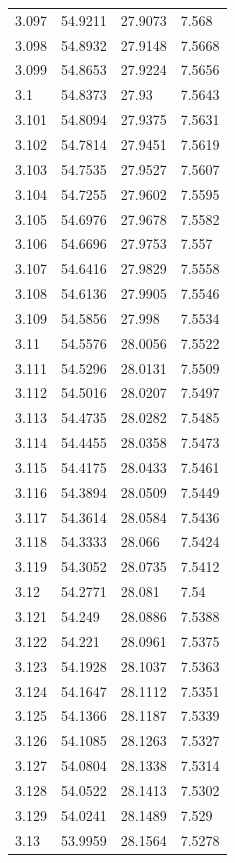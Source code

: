 \begin{tabular}{llll}
3.097 & 54.9211 & 27.9073 & 7.568 \\
3.098 & 54.8932 & 27.9148 & 7.5668 \\
3.099 & 54.8653 & 27.9224 & 7.5656 \\
3.1 & 54.8373 & 27.93 & 7.5643 \\
3.101 & 54.8094 & 27.9375 & 7.5631 \\
3.102 & 54.7814 & 27.9451 & 7.5619 \\
3.103 & 54.7535 & 27.9527 & 7.5607 \\
3.104 & 54.7255 & 27.9602 & 7.5595 \\
3.105 & 54.6976 & 27.9678 & 7.5582 \\
3.106 & 54.6696 & 27.9753 & 7.557 \\
3.107 & 54.6416 & 27.9829 & 7.5558 \\
3.108 & 54.6136 & 27.9905 & 7.5546 \\
3.109 & 54.5856 & 27.998 & 7.5534 \\
3.11 & 54.5576 & 28.0056 & 7.5522 \\
3.111 & 54.5296 & 28.0131 & 7.5509 \\
3.112 & 54.5016 & 28.0207 & 7.5497 \\
3.113 & 54.4735 & 28.0282 & 7.5485 \\
3.114 & 54.4455 & 28.0358 & 7.5473 \\
3.115 & 54.4175 & 28.0433 & 7.5461 \\
3.116 & 54.3894 & 28.0509 & 7.5449 \\
3.117 & 54.3614 & 28.0584 & 7.5436 \\
3.118 & 54.3333 & 28.066 & 7.5424 \\
3.119 & 54.3052 & 28.0735 & 7.5412 \\
3.12 & 54.2771 & 28.081 & 7.54 \\
3.121 & 54.249 & 28.0886 & 7.5388 \\
3.122 & 54.221 & 28.0961 & 7.5375 \\
3.123 & 54.1928 & 28.1037 & 7.5363 \\
3.124 & 54.1647 & 28.1112 & 7.5351 \\
3.125 & 54.1366 & 28.1187 & 7.5339 \\
3.126 & 54.1085 & 28.1263 & 7.5327 \\
3.127 & 54.0804 & 28.1338 & 7.5314 \\
3.128 & 54.0522 & 28.1413 & 7.5302 \\
3.129 & 54.0241 & 28.1489 & 7.529 \\
3.13 & 53.9959 & 28.1564 & 7.5278 \\

\end{tabular}

